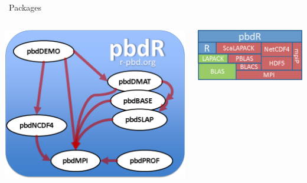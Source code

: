 \begin{frame}
  \begin{block}{\pbdR\ Packages}
    \begin{center}
      \begin{columns}\hspace{.2cm}
        \begin{column}{.52\textwidth}
          \includegraphics[scale=.4]{../common/pics/pbdR}
        \end{column}
        \hspace{.05cm}
        \begin{column}{.4\textwidth}
          \includegraphics[scale=.45]{../common/pics/libs}
        \end{column}
      \end{columns}
    \end{center}
  \end{block}
\end{frame}


